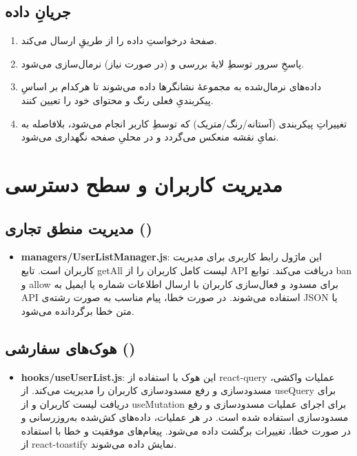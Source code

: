 \subsection{جریانِ داده}
\begin{enumerate}
  \item صفحهٔ  درخواستِ داده را از طریقِ  ارسال می‌کند.
  \item پاسخِ سرور توسطِ لایهٔ  بررسی و (در صورت نیاز) نرمال‌سازی می‌شود.
  \item داده‌های نرمال‌شده به مجموعهٔ نشانگرها داده می‌شوند تا هرکدام بر اساسِ پیکربندیِ فعلی رنگ و محتوای  خود را تعیین کنند.
  \item تغییراتِ پیکربندی (آستانه/رنگ/متریک) که توسطِ کاربر انجام می‌شود، بلافاصله به نمایِ نقشه منعکس می‌گردد و در  محلیِ صفحه نگهداری می‌شود.
\end{enumerate}

    \section{مدیریت کاربران و سطح دسترسی}
    \subsection{مدیریت منطق تجاری ()}
    \begin{itemize}
    	\item \textbf{managers/UserListManager.js}:
    	این ماژول رابط کاربری برای مدیریت کاربران است.
    	تابع getAll لیست کامل کاربران را از API دریافت می‌کند.
    	توابع ban و allow برای مسدود و فعال‌سازی کاربران با ارسال اطلاعات شماره یا ایمیل به API استفاده می‌شوند.
    	در صورت خطا، پیام مناسب به صورت رشته‌ی JSON یا متن خطا برگردانده می‌شود.
    \end{itemize}
    
    \subsection{هوک‌های سفارشی ()}
    \begin{itemize}
    	\item \textbf{hooks/useUserList.js}:
    	این هوک با استفاده از react-query عملیات واکشی، مسدودسازی و رفع مسدودسازی کاربران را مدیریت می‌کند.
    	از useQuery برای دریافت لیست کاربران و از useMutation برای اجرای عملیات مسدودسازی و رفع مسدودسازی استفاده شده است.
    	در هر عملیات، داده‌های کش‌شده به‌روزرسانی و در صورت خطا، تغییرات برگشت داده می‌شود.
    	پیغام‌های موفقیت و خطا با استفاده از react-toastify نمایش داده می‌شوند.
    \end{itemize}
    
